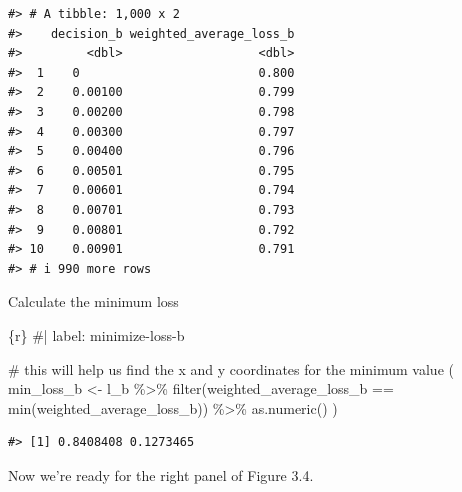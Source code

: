 \documentclass[
  letterpaper,
  DIV=11,
  numbers=noendperiod]{scrreprt}
\newenvironment{Shaded}{\begin{snugshade}}{\end{snugshade}}
\newcommand{\CommentTok}[1]{\textcolor[rgb]{0.37,0.37,0.37}{#1}}
\newcommand{\FunctionTok}[1]{\textcolor[rgb]{0.28,0.35,0.67}{#1}}
\newcommand{\InformationTok}[1]{\textcolor[rgb]{0.37,0.37,0.37}{#1}}
\newcommand{\NormalTok}[1]{\textcolor[rgb]{0.00,0.23,0.31}{#1}}
\newcommand{\OtherTok}[1]{\textcolor[rgb]{0.00,0.23,0.31}{#1}}
\newcommand{\SpecialCharTok}[1]{\textcolor[rgb]{0.37,0.37,0.37}{#1}}
\begin{document}
\begin{verbatim}
#> # A tibble: 1,000 x 2
#>    decision_b weighted_average_loss_b
#>         <dbl>                   <dbl>
#>  1    0                         0.800
#>  2    0.00100                   0.799
#>  3    0.00200                   0.798
#>  4    0.00300                   0.797
#>  5    0.00400                   0.796
#>  6    0.00501                   0.795
#>  7    0.00601                   0.794
#>  8    0.00701                   0.793
#>  9    0.00801                   0.792
#> 10    0.00901                   0.791
#> # i 990 more rows
\end{verbatim}

Calculate the minimum loss

\begin{Shaded}
\begin{Highlighting}[]
\InformationTok{\textasciigrave{}\textasciigrave{}\textasciigrave{}\{r\}}
\CommentTok{\#| label: minimize{-}loss{-}b}

\CommentTok{\# this will help us find the x and y coordinates for the minimum value}
\NormalTok{(}
\NormalTok{    min\_loss\_b }\OtherTok{\textless{}{-}}
\NormalTok{      l\_b }\SpecialCharTok{\%\textgreater{}\%} 
      \FunctionTok{filter}\NormalTok{(weighted\_average\_loss\_b }\SpecialCharTok{==} \FunctionTok{min}\NormalTok{(weighted\_average\_loss\_b)) }\SpecialCharTok{\%\textgreater{}\%} 
      \FunctionTok{as.numeric}\NormalTok{()}
\NormalTok{)}
\InformationTok{\textasciigrave{}\textasciigrave{}\textasciigrave{}}
\end{Highlighting}
\end{Shaded}

\begin{verbatim}
#> [1] 0.8408408 0.1273465
\end{verbatim}

Now we're ready for the right panel of Figure 3.4.
\end{document}
